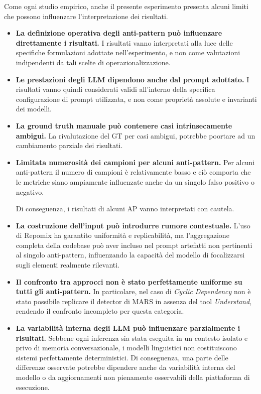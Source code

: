 Come ogni studio empirico, anche il presente esperimento presenta alcuni limiti che possono influenzare l’interpretazione dei risultati.

\begin{itemize}
    \item \textbf{La definizione operativa degli anti-pattern può influenzare direttamente i risultati.}  
    I risultati vanno interpretati alla luce delle specifiche formulazioni adottate nell’esperimento, e non come valutazioni indipendenti da tali scelte di operazionalizzazione.


    \item \textbf{Le prestazioni degli LLM dipendono anche dal prompt adottato.}  
    I risultati vanno quindi considerati validi all’interno della specifica configurazione di prompt utilizzata, e non come proprietà assolute e invarianti dei modelli.

    \item \textbf{La ground truth manuale può contenere casi intrinsecamente ambigui.}  
    La rivalutazione del GT per casi ambigui, potrebbe poortare ad un cambiamento parziale dei risultati.

    \item \textbf{Limitata numerosità dei campioni per alcuni anti-pattern.}  
    Per alcuni anti-pattern il numero di campioni è relativamente basso e ciò comporta che le metriche siano ampiamente influenzate anche da un singolo falso positivo o negativo. 

    Di conseguenza, i risultati di alcuni AP vanno interpretati con cautela.

    \item \textbf{La costruzione dell’input può introdurre rumore contestuale.}  
    L’uso di Repomix ha garantito uniformità e replicabilità, ma l’aggregazione completa della codebase può aver incluso nel prompt artefatti non pertinenti al singolo anti-pattern, influenzando la capacità del modello di focalizzarsi sugli elementi realmente rilevanti.

    \item \textbf{Il confronto tra approcci non è stato perfettamente uniforme su tutti gli anti-pattern.}  
    In particolare, nel caso di \textit{Cyclic Dependency} non è stato possibile replicare il detector di MARS in assenza del tool \textit{Understand}, rendendo il confronto incompleto per questa categoria.

    \item \textbf{La variabilità interna degli LLM può influenzare parzialmente i risultati.}  
    Sebbene ogni inferenza sia stata eseguita in un contesto isolato e privo di memoria conversazionale, i modelli linguistici non costituiscono sistemi perfettamente deterministici. Di conseguenza, una parte delle differenze osservate potrebbe dipendere anche da variabilità interna del modello o da aggiornamenti non pienamente osservabili della piattaforma di esecuzione.

\end{itemize}
